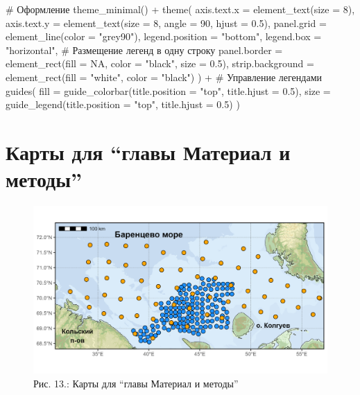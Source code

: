 \documentclass[
  letterpaper,
  DIV=11,
  numbers=noendperiod]{scrreprt}
\newenvironment{Shaded}{\begin{snugshade}}{\end{snugshade}}
\newcommand{\AttributeTok}[1]{\textcolor[rgb]{0.40,0.45,0.13}{#1}}
\newcommand{\CommentTok}[1]{\textcolor[rgb]{0.37,0.37,0.37}{#1}}
\newcommand{\ConstantTok}[1]{\textcolor[rgb]{0.56,0.35,0.01}{#1}}
\newcommand{\DecValTok}[1]{\textcolor[rgb]{0.68,0.00,0.00}{#1}}
\newcommand{\FloatTok}[1]{\textcolor[rgb]{0.68,0.00,0.00}{#1}}
\newcommand{\FunctionTok}[1]{\textcolor[rgb]{0.28,0.35,0.67}{#1}}
\newcommand{\NormalTok}[1]{\textcolor[rgb]{0.00,0.23,0.31}{#1}}
\newcommand{\SpecialCharTok}[1]{\textcolor[rgb]{0.37,0.37,0.37}{#1}}
\newcommand{\StringTok}[1]{\textcolor[rgb]{0.13,0.47,0.30}{#1}}
\begin{document}
\begin{Shaded}
\begin{Highlighting}[]
  \CommentTok{\# Оформление}
  \FunctionTok{theme\_minimal}\NormalTok{() }\SpecialCharTok{+}
  \FunctionTok{theme}\NormalTok{(}
    \AttributeTok{axis.text.x =} \FunctionTok{element\_text}\NormalTok{(}\AttributeTok{size =} \DecValTok{8}\NormalTok{),}
    \AttributeTok{axis.text.y =} \FunctionTok{element\_text}\NormalTok{(}\AttributeTok{size =} \DecValTok{8}\NormalTok{, }\AttributeTok{angle =} \DecValTok{90}\NormalTok{, }\AttributeTok{hjust =} \FloatTok{0.5}\NormalTok{),}
    \AttributeTok{panel.grid =} \FunctionTok{element\_line}\NormalTok{(}\AttributeTok{color =} \StringTok{"grey90"}\NormalTok{),}
    \AttributeTok{legend.position =} \StringTok{"bottom"}\NormalTok{,}
    \AttributeTok{legend.box =} \StringTok{"horizontal"}\NormalTok{,  }\CommentTok{\# Размещение легенд в одну строку}
    \AttributeTok{panel.border =} \FunctionTok{element\_rect}\NormalTok{(}\AttributeTok{fill =} \ConstantTok{NA}\NormalTok{, }\AttributeTok{color =} \StringTok{"black"}\NormalTok{, }\AttributeTok{size =} \FloatTok{0.5}\NormalTok{),}
    \AttributeTok{strip.background =} \FunctionTok{element\_rect}\NormalTok{(}\AttributeTok{fill =} \StringTok{"white"}\NormalTok{, }\AttributeTok{color =} \StringTok{"black"}\NormalTok{)}
\NormalTok{  ) }\SpecialCharTok{+}
  \CommentTok{\# Управление легендами}
  \FunctionTok{guides}\NormalTok{(}
    \AttributeTok{fill =} \FunctionTok{guide\_colorbar}\NormalTok{(}\AttributeTok{title.position =} \StringTok{"top"}\NormalTok{, }\AttributeTok{title.hjust =} \FloatTok{0.5}\NormalTok{),}
    \AttributeTok{size =} \FunctionTok{guide\_legend}\NormalTok{(}\AttributeTok{title.position =} \StringTok{"top"}\NormalTok{, }\AttributeTok{title.hjust =} \FloatTok{0.5}\NormalTok{)}
\NormalTok{  )}
\end{Highlighting}
\end{Shaded}

\section{Карты для ``главы Материал и
методы''}\label{ux43aux430ux440ux442ux44b-ux434ux43bux44f-ux433ux43bux430ux432ux44b-ux43cux430ux442ux435ux440ux438ux430ux43b-ux438-ux43cux435ux442ux43eux434ux44b}

\begin{figure}[H]

{\centering \includegraphics[width=0.8\linewidth,height=\textheight,keepaspectratio]{images/KARTOGRAPH13.jpg}

}

\caption{Рис. 13.: Карты для ``главы Материал и методы''}

\end{figure}%
\end{document}
